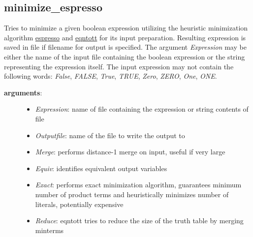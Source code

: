 \documentclass[letterpaper,10pt,english]{sphinxmanual}
\begin{document}
\subsection{minimize\_espresso}
\label{BooleanExpressions:minimize-espresso}\label{BooleanExpressions:id2}

\begin{fulllineitems}
\label{BooleanExpressions:PyBoolNet.BooleanExpressions.minimize_espresso}
Tries to minimize a given boolean expression utilizing the heuristic minimization algorithm
\href{http://chmod755.tumblr.com/post/31417234230/espresso-heuristic-logic-minimizer}{espresso} and \href{https://code.google.com/archive/p/eqntott/}{eqntott} for its input preparation. Resulting expression is saved
in file if filename for output is specified. The argument \emph{Expression} may be either the name
of the input file containing the boolean expression or the string representing the expression
itself. The input expression may not contain the following words: \emph{False}, \emph{FALSE}, \emph{True},
\emph{TRUE}, \emph{Zero}, \emph{ZERO}, \emph{One}, \emph{ONE}.
\begin{description}
\item[{\textbf{arguments}:}] \leavevmode\begin{itemize}
\item {} 
\emph{Expression}: name of file containing the expression or string contents of file

\item {} 
\emph{Outputfile}: name of the file to write the output to

\item {} 
\emph{Merge}: performs distance-1 merge on input, useful if very large

\item {} 
\emph{Equiv}: identifies equivalent output variables

\item {} 
\emph{Exact}: performs exact minimization algorithm, guarantees minimum number of product terms and heuristically minimizes number of literals, potentially expensive

\item {} 
\emph{Reduce}: eqntott tries to reduce the size of the truth table by merging minterms


\end{itemize}
\end{description}
\end{fulllineitems}
\end{document}

